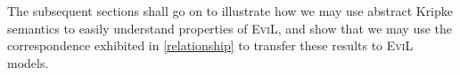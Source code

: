 The subsequent sections shall go on to illustrate how we may use
abstract Kripke semantics to easily understand properties of
\textsc{EviL}, and show that we may use the correspondence exhibited
in \eqref{relationship} to transfer these results to \textsc{EviL} models.

